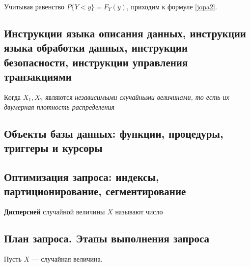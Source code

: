 Учитывая равенство $P\{Y < y\} = 	F_Y(y)$, приходим к формуле \ref{jopa2}.

\subsection{Инструкции языка описания данных, инструкции языка обработки данных, инструкции безопасности, инструкции управления транзакциями}

Когда $X_1, X_2$ являются \textit{независимыми случайными величинами, то есть их двумерная плотность распределения}



\subsection{Объекты базы данных: функции, процедуры, триггеры и курсоры}


\subsection{Оптимизация запроса: индексы, партиционирование, сегментирование}

\textbf{Дисперсией} случайной величины $X$ называют число



\subsection{План запроса. Этапы выполнения запроса}

Пусть $X$ --- случайная величина.
